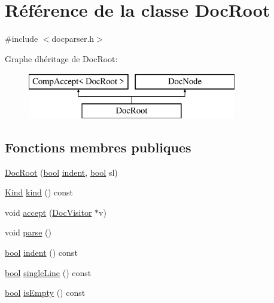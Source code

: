 \hypertarget{class_doc_root}{}\section{Référence de la classe Doc\+Root}
\label{class_doc_root}


{\ttfamily \#include $<$docparser.\+h$>$}

Graphe d\textquotesingle{}héritage de Doc\+Root\+:\begin{figure}[H]
\begin{center}
\leavevmode
\includegraphics[height=2.000000cm]{class_doc_root}
\end{center}
\end{figure}
\subsection*{Fonctions membres publiques}
\begin{DoxyCompactItemize}
\item 
\hyperlink{class_doc_root_ae1a133da5f3562011cfe90cfa145219f}{Doc\+Root} (\hyperlink{qglobal_8h_a1062901a7428fdd9c7f180f5e01ea056}{bool} \hyperlink{class_doc_root_a55c28ebe3e2082dbc9eaf5b4c8523c32}{indent}, \hyperlink{qglobal_8h_a1062901a7428fdd9c7f180f5e01ea056}{bool} sl)
\item 
\hyperlink{class_doc_node_aebd16e89ca590d84cbd40543ea5faadb}{Kind} \hyperlink{class_doc_root_abd93a1d4cb87a740b573f263bce16bb0}{kind} () const 
\item 
void \hyperlink{class_doc_root_aa5ddf3ae4f0557846668b54742d9b628}{accept} (\hyperlink{class_doc_visitor}{Doc\+Visitor} $\ast$v)
\item 
void \hyperlink{class_doc_root_a860207dd6bee34648ddbfd55e3ddaff8}{parse} ()
\item 
\hyperlink{qglobal_8h_a1062901a7428fdd9c7f180f5e01ea056}{bool} \hyperlink{class_doc_root_a55c28ebe3e2082dbc9eaf5b4c8523c32}{indent} () const 
\item 
\hyperlink{qglobal_8h_a1062901a7428fdd9c7f180f5e01ea056}{bool} \hyperlink{class_doc_root_a1c51c5192448ebd4f9fb4b25f494c07a}{single\+Line} () const 
\item 
\hyperlink{qglobal_8h_a1062901a7428fdd9c7f180f5e01ea056}{bool} \hyperlink{class_doc_root_afaad083d5339b35bbac05bea90c0a55a}{is\+Empty} () const 
\end{DoxyCompactItemize}
